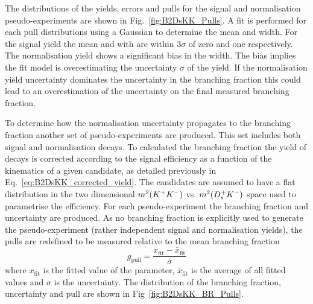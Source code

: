 
The distributions of the yields, errors and pulls for the signal and normalisation pseudo-experiments are shown in Fig.~\ref{fig:B2DsKK_Pulls}. A fit is performed for each pull distributions using a Gaussian to determine the mean and width. 
For the signal yield the mean and with are within $3\sigma$ of zero and one respectively. The normalisation yield shows a significant bias in the width. The bias implies the fit model is overestimating the uncertainty $\sigma$ of the yield.
If the normalisation yield uncertainty dominates the uncertainty in the branching fraction this could lead to an overestimation of the uncertainty on the final measured branching fraction.

To determine how the normalisation uncertainty propagates to the branching fraction another set of pseudo-experiments are produced.
This set includes both signal and normalisation decays. To calculated the branching fraction the yield of \decay{\Bp}{\Dsp\Kp\Km} decays is corrected according to the signal efficiency as a function of the kinematics of a given candidate, as detailed previously in Eq.~\ref{eq:B2DsKK_corrected_yield}. The candidates are assumed to have a flat distribution in the two dimensional $m^{2}({{K}^+}{{K}^-})$ vs. $m^{2}({{D}^+_{s}}{{K}^-})$ space used to parametrise the efficiency. For each pseudo-experiment the branching fraction and uncertainty are produced. As no branching fraction is explicitly used to generate the pseudo-experiment (rather independent signal and normalisation yields), the pulls are redefined to be measured relative to the mean branching fraction
\begin{equation}
g_{\text{pull}} = \frac{x_{\text{fit}} - \bar{x}_{\text{fit}} }{\sigma}
\end{equation}
where $x_{\text{fit}}$ is the fitted value of the parameter, $\bar{x}_{\text{fit}}$ is the average of all fitted values and $\sigma$ is the uncertainty. The distribution of the branching fraction, uncertainty and pull are shown in Fig~\ref{fig:B2DsKK_BR_Pulls}. 


